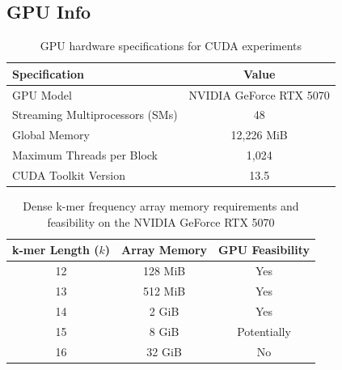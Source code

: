 \documentclass{article}
\begin{document}
\vspace{\baselineskip}

\FloatBarrier

\subsection{GPU Info}

\vspace{\baselineskip}

\begin{table}[H]
    \centering
    \caption{GPU hardware specifications for CUDA experiments}
    \label{tab:gpu_specs}
    \begin{tabular}{lc}
        \toprule
        \textbf{Specification} & \textbf{Value} \\
        \midrule
        GPU Model & NVIDIA GeForce RTX 5070 \\
        Streaming Multiprocessors (SMs) & 48 \\
        Global Memory & 12,226 MiB \\
        Maximum Threads per Block & 1,024 \\
        CUDA Toolkit Version & 13.5 \\
        \bottomrule
    \end{tabular}
\end{table}



\begin{table}[H]
    \centering
    \caption{Dense k-mer frequency array memory requirements
    and feasibility on the NVIDIA GeForce RTX 5070}
    \label{tab:gpu_kmer_memory}
    \begin{tabular}{ccc}
        \toprule
        \textbf{k-mer Length ($k$)} &
        \textbf{Array Memory} &
        \textbf{GPU Feasibility} \\
        \midrule
        12 & 128 MiB & Yes \\
        13 & 512 MiB & Yes \\
        14 & 2 GiB & Yes \\
        15 & 8 GiB & Potentially \\
        16 & 32 GiB & No \\
        \bottomrule
    \end{tabular}
\end{table}

\vspace{\baselineskip}

\FloatBarrier
\end{document}
